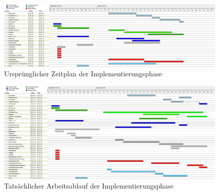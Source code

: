 \documentclass[a4paper, 11pt]{article}
\begin{document}
\begin{figure}[h]
\centering
\vspace{-2.5cm}\includegraphics[angle=90,scale=0.4]{zeitplan}
\caption{Ursprünglicher Zeitplan der Implementierungsphase}
\label{fig:zeitplan}
\end{figure}
\begin{figure}[h]
\centering
\vspace{-2.25cm}\includegraphics[angle=90,scale=0.4]{zeitplan_final}
\caption{Tatsächlicher Arbeitsablauf der Implementierungsphase}
\label{fig:zeitplan_final}
\end{figure}

\makeatletter
{}
\makeatother
\printglossary[type=main, title={Glossar}, toctitle={Glossar}, style=myAltlist]
\end{document}
